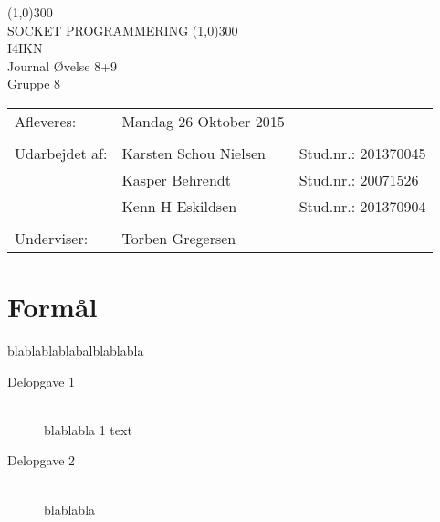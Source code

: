 \documentclass{article}
\begin{document}
\begin{titlepage}
\begin{center}
\line(1,0){300}\\
[0.25in]
\huge{SOCKET PROGRAMMERING} 											%
\line(1,0){300}\\
[1cm]
\huge{I4IKN\\ Journal Øvelse 8+9} \\
Gruppe 8\\ %
[3cm]

\large
\begin{tabular}{l l l}
Afleveres: 		& Mandag 26 Oktober 2015 & 						\\ 		%
																\\
Udarbejdet af:  & Karsten Schou Nielsen  & Stud.nr.: 201370045  \\
				& Kasper Behrendt		 & Stud.nr.: 20071526   \\
				& Kenn H Eskildsen 		 & Stud.nr.: 201370904  \\
																\\
Underviser:		& Torben Gregersen 								\\		%

\end{tabular}
\end{center}
\end{titlepage}

\newpage
\tableofcontents
\thispagestyle{empty}
\cleardoublepage
\setcounter{page}{1}
\newpage
\section{Formål}

blablablablabalblablabla

\begin{description}
	\item[Delopgave 1] \hfill \\
		blablabla 1 text
	\item[Delopgave 2] \hfill \\
		blablabla
\end{description}
\end{document}
